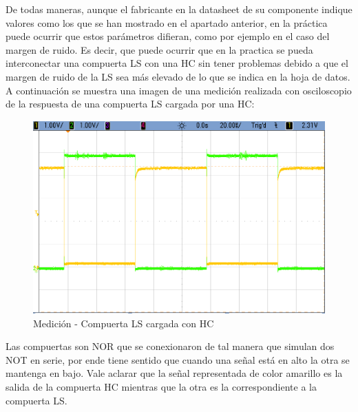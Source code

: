 De todas maneras, aunque el fabricante en la datasheet de su componente
indique valores como los que se han mostrado en el apartado anterior,
en la práctica puede ocurrir que estos parámetros difieran, como por
ejemplo en el caso del margen de ruido. Es decir, que puede ocurrir
que en la practica se pueda interconectar una compuerta LS con una
HC sin tener problemas debido a que el margen de ruido de la LS sea
más elevado de lo que se indica en la hoja de datos. A continuación
se muestra una imagen de una medición realizada con osciloscopio de
la respuesta de una compuerta LS cargada por una HC:

\begin{figure}[H]
\begin{centering}
\includegraphics[scale=0.4]{LS-CargadoConHC02}
\par\end{centering}
\caption{Medición - Compuerta LS cargada con HC}
\end{figure}

Las compuertas son NOR que se conexionaron de tal manera que simulan
dos NOT en serie, por ende tiene sentido que cuando una señal está
en alto la otra se mantenga en bajo. Vale aclarar que la señal representada
de color amarillo es la salida de la compuerta HC mientras que la
otra es la correspondiente a la compuerta LS.